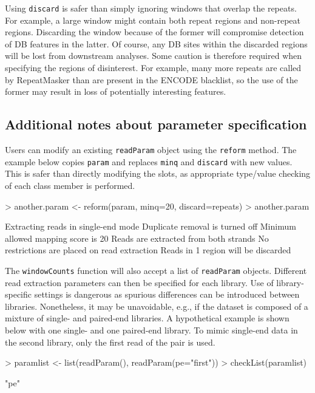 \documentclass[12pt]{report}
\renewenvironment{Schunk}{\vspace{0pt}}{\vspace{0pt}}
\newcommand{\code}[1]{{\small\texttt{#1}}}
\begin{document}
Using \code{discard} is safer than simply ignoring windows that overlap the repeats. 
For example, a large window might contain both repeat regions and non-repeat regions. 
Discarding the window because of the former will compromise detection of DB features in the latter. 
Of course, any DB sites within the discarded regions will be lost from downstream analyses.  
Some caution is therefore required when specifying the regions of disinterest.
For example, many more repeats are called by RepeatMasker than are present in the ENCODE blacklist, so the use of the former may result in loss of potentially interesting features.

\subsection{Additional notes about parameter specification}
Users can modify an existing \code{readParam} object using the \code{reform} method.
The example below copies \code{param} and replaces \code{minq} and \code{discard} with new values.
This is safer than directly modifying the slots, as appropriate type/value checking of each class member is performed.

\begin{Schunk}
\begin{Sinput}
> another.param <- reform(param, minq=20, discard=repeats)
> another.param
\end{Sinput}
\begin{Soutput}
    Extracting reads in single-end mode
    Duplicate removal is turned off 
    Minimum allowed mapping score is 20 
    Reads are extracted from both strands
    No restrictions are placed on read extraction
    Reads in 1 region will be discarded
\end{Soutput}
\end{Schunk}

The \code{windowCounts} function will also accept a list of \code{readParam} objects. 
Different read extraction parameters can then be specified for each library.
Use of library-specific settings is dangerous as spurious differences can be introduced between libraries.
Nonetheless, it may be unavoidable, e.g., if the dataset is composed of a mixture of single- and paired-end libraries.
A hypothetical example is shown below with one single- and one paired-end library.
To mimic single-end data in the second library, only the first read of the pair is used.

\begin{Schunk}
\begin{Sinput}
> paramlist <- list(readParam(), readParam(pe="first"))
> checkList(paramlist)
\end{Sinput}
\begin{Soutput}
[1] "pe"
\end{Soutput}
\end{Schunk}
\end{document}
